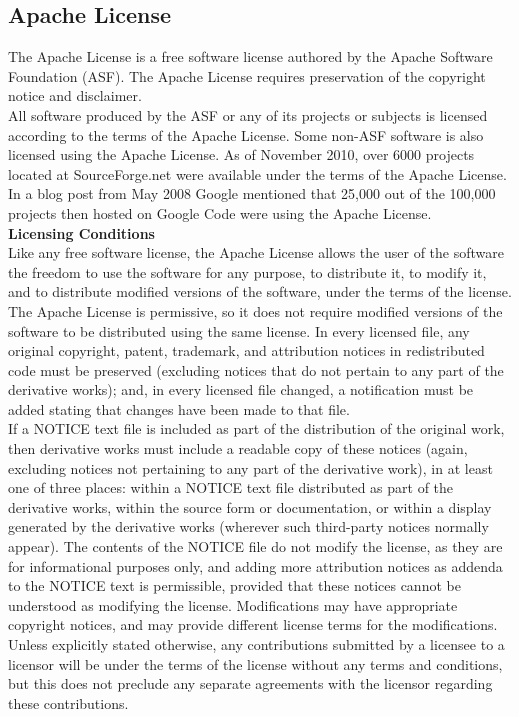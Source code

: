 \subsection{Apache License}
\hspace*{0.82cm}The Apache License is a free software license authored by the Apache Software Foundation (ASF). The Apache License 
requires preservation of the copyright notice and disclaimer.\\[0.5cm]
\hspace*{0.82cm}All software produced by the ASF or any of its projects or subjects is licensed according to the terms of the Apache 
License. Some non-ASF software is also licensed using the Apache License. As of November 2010, over 6000 projects located at 
SourceForge.net were available under the terms of the Apache License. In a blog post from May 2008 Google mentioned that 25,000 out 
of the 100,000 projects then hosted on Google Code were using the Apache License.\\[0.5cm]
\textbf{Licensing Conditions}\\
\hspace*{0.82cm}Like any free software license, the Apache License allows the user of the software the freedom to use the software for 
any purpose, to distribute it, to modify it, and to distribute modified versions of the software, under the terms of the license.\\[0.5cm]
\hspace*{0.82cm}The Apache License is permissive, so it does not require modified versions of the software to be distributed using the 
same license. In every licensed file, any original copyright, patent, trademark, and attribution notices in redistributed code must be 
preserved (excluding notices that do not pertain to any part of the derivative works); and, in every licensed file changed, a notification 
must be added stating that changes have been made to that file.\\[0.5cm]
\hspace*{0.82cm}If a NOTICE text file is included as part of the distribution of the original work, then derivative works must include 
a readable copy of these notices (again, excluding notices not pertaining to any part of the derivative work), in at least one of three 
places: within a NOTICE text file distributed as part of the derivative works, within the source form or documentation, or within a 
display generated by the derivative works (wherever such third-party notices normally appear). The contents of the NOTICE file do not 
modify the license, as they are for informational purposes only, and adding more attribution notices as addenda to the NOTICE text is 
permissible, provided that these notices cannot be understood as modifying the license. Modifications may have appropriate copyright 
notices, and may provide different license terms for the modifications.\\[0.5cm]
\hspace*{0.82cm}Unless explicitly stated otherwise, any contributions submitted by a licensee to a licensor will be under the terms of 
the license without any terms and conditions, but this does not preclude any separate agreements with the licensor regarding these contributions.